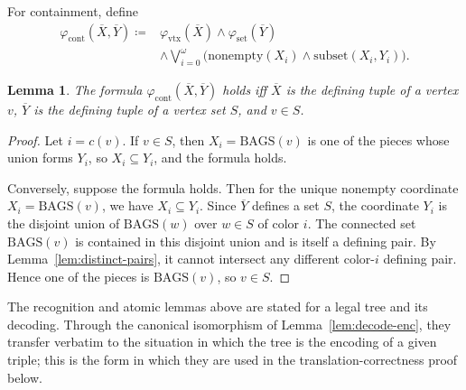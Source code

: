 \documentclass[11pt]{article}
\newtheorem{lemma}[theorem]{Lemma}
\theoremstyle{definition}
\newcommand{\defeq}{\coloneqq}
\newcommand{\Bags}{\mathrm{BAGS}}
\newcommand{\vtx}{\mathrm{vtx}}
\newcommand{\set}{\mathrm{set}}
\newcommand{\cont}{\mathrm{cont}}
\newcommand{\subsetf}{\mathrm{subset}}
\newcommand{\nonempty}{\mathrm{nonempty}}
\newcommand{\tuple}[1]{\overline{#1}}
\begin{document}
For containment, define
\[
\begin{aligned}
  \varphi_{\cont}(\tuple X,\tuple Y)\defeq{}&
  \varphi_{\vtx}(\tuple X)\wedge\varphi_{\set}(\tuple Y)\\
  &\wedge\bigvee_{i=0}^{\omega}
  \bigl(\nonempty(X_i)\wedge\subsetf(X_i,Y_i)\bigr).
\end{aligned}
\]

\begin{lemma}\label{lem:cont}
The formula \(\varphi_{\cont}(\tuple X,\tuple Y)\) holds iff \(\tuple X\) is the
defining tuple of a vertex \(v\), \(\tuple Y\) is the defining tuple of a vertex
set \(S\), and \(v\in S\).
\end{lemma}

\begin{proof}
Let \(i=c(v)\).  If \(v\in S\), then \(X_i=\Bags(v)\) is one of the pieces whose
union forms \(Y_i\), so \(X_i\subseteq Y_i\), and the formula holds.

Conversely, suppose the formula holds.  Then for the unique nonempty coordinate
\(X_i=\Bags(v)\), we have \(X_i\subseteq Y_i\).  Since \(\tuple Y\) defines a set
\(S\), the coordinate \(Y_i\) is the disjoint union of \(\Bags(w)\) over
\(w\in S\) of color \(i\).  The connected set \(\Bags(v)\) is contained in this
disjoint union and is itself a defining pair.  By Lemma~\ref{lem:distinct-pairs}, it cannot intersect
any different color-\(i\) defining pair.  Hence one of the pieces is
\(\Bags(v)\), so \(v\in S\).
\end{proof}

The recognition and atomic lemmas above are stated for a legal tree and its
decoding.  Through the canonical isomorphism of Lemma~\ref{lem:decode-enc},
they transfer verbatim to the situation in which the tree is the encoding of a
given triple; this is the form in which they are used in the
translation-correctness proof below.
\end{document}
